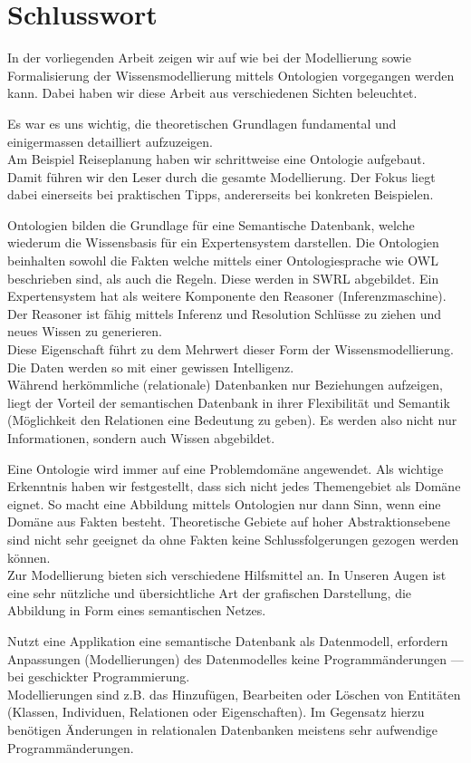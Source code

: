 \chapter{Schlusswort}
\label{chap:schlusswort}

In der vorliegenden Arbeit zeigen wir auf wie bei der Modellierung sowie Formalisierung der Wissensmodellierung mittels Ontologien vorgegangen werden kann. Dabei haben wir diese Arbeit aus verschiedenen Sichten beleuchtet. 

Es war es uns wichtig, die theoretischen Grundlagen fundamental und einigermassen detailliert aufzuzeigen. \\
Am Beispiel Reiseplanung haben wir schrittweise eine Ontologie aufgebaut. Damit führen wir den Leser durch die gesamte Modellierung. Der Fokus liegt dabei einerseits bei praktischen Tipps, andererseits bei konkreten Beispielen. 

Ontologien bilden die Grundlage für eine Semantische Datenbank, welche wiederum die Wissensbasis für ein Expertensystem darstellen. Die Ontologien beinhalten sowohl die Fakten welche mittels einer Ontologiesprache wie OWL beschrieben sind, als auch die Regeln. Diese werden in SWRL abgebildet. Ein Expertensystem hat als weitere Komponente den Reasoner (Inferenzmaschine). Der Reasoner ist fähig mittels Inferenz und Resolution Schlüsse zu ziehen und neues Wissen zu generieren.\\
Diese Eigenschaft führt zu dem Mehrwert dieser Form der Wissensmodellierung. Die Daten werden so mit einer gewissen Intelligenz.\\
Während herkömmliche (relationale) Datenbanken nur Beziehungen aufzeigen, liegt der Vorteil der semantischen Datenbank in ihrer Flexibilität und Semantik (Möglichkeit den Relationen eine Bedeutung zu geben). Es werden also nicht nur Informationen, sondern auch Wissen abgebildet.

Eine Ontologie wird immer auf eine Problemdomäne angewendet. Als wichtige Erkenntnis haben wir festgestellt, dass sich nicht jedes Themengebiet als Domäne eignet. So macht eine Abbildung mittels Ontologien nur dann Sinn, wenn eine Domäne aus Fakten besteht. Theoretische Gebiete auf hoher Abstraktionsebene sind nicht sehr geeignet da ohne Fakten keine Schlussfolgerungen gezogen werden können.\\
Zur Modellierung bieten sich verschiedene Hilfsmittel an. In Unseren Augen ist eine sehr nützliche und übersichtliche Art der grafischen Darstellung, die Abbildung in Form eines semantischen Netzes.

Nutzt eine Applikation eine semantische Datenbank als Datenmodell, erfordern Anpassungen (Modellierungen) des Datenmodelles keine Programmänderungen --- bei geschickter Programmierung.\\
Modellierungen sind z.B. das Hinzufügen, Bearbeiten oder Löschen von Entitäten (Klassen, Individuen, Relationen oder Eigenschaften).
Im Gegensatz hierzu benötigen Änderungen in relationalen Datenbanken meistens sehr aufwendige Programmänderungen.




